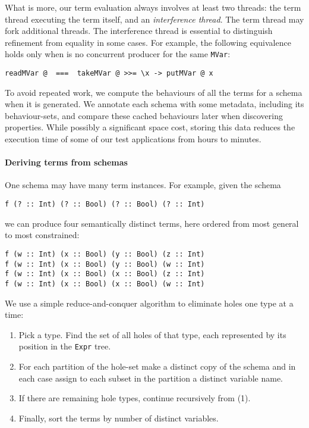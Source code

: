 What is more, our term evaluation always involves at least two
threads: the term thread executing the term itself, and an
\emph{interference thread}.  The term thread may fork additional
threads.  The interference thread is essential to distinguish
refinement from equality in some cases.  For example, the following
equivalence holds only when is no concurrent producer for the same
\verb|MVar|:

\begin{verbatim}
readMVar @  ===  takeMVar @ >>= \x -> putMVar @ x
\end{verbatim}

To avoid repeated work, we compute the behaviours of all the terms for
a schema when it is generated.  We annotate each schema with some
metadata, including its behaviour-sets, and compare these cached
behaviours later when discovering properties.  While possibly a
significant space cost, storing this data reduces the execution time
of some of our test applications from hours to minutes.

\paragraph{Deriving terms from schemas}
One schema may have many term instances.  For example, given the
schema

\begin{verbatim}
f (? :: Int) (? :: Bool) (? :: Bool) (? :: Int)
\end{verbatim}

\noindent
we can produce four semantically distinct terms, here ordered from
most general to most constrained:

\begin{verbatim}
f (w :: Int) (x :: Bool) (y :: Bool) (z :: Int)
f (w :: Int) (x :: Bool) (y :: Bool) (w :: Int)
f (w :: Int) (x :: Bool) (x :: Bool) (z :: Int)
f (w :: Int) (x :: Bool) (x :: Bool) (w :: Int)
\end{verbatim}

We use a simple reduce-and-conquer algorithm to eliminate holes one
type at a time:

\begin{enumerate}
\item Pick a type.  Find the set of all holes of that type, each
  represented by its position in the \verb|Expr| tree.
\item For each partition of the hole-set make a distinct copy of the
  schema and in each case assign to each subset in the partition a
  distinct variable name.
\item If there are remaining hole types, continue recursively from
  (1).
\item Finally, sort the terms by number of distinct variables.
\end{enumerate}

